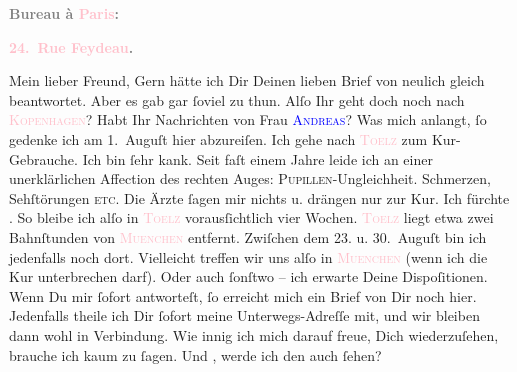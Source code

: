            \pstart
           \begin{otherlanguage}{french}\textcolor{gray}{\textbf{\textbf{Bureau à \textcolor{pink}{Paris}{}\ledrightnote{\textcolor{pink}{Paris}}:}}}\end{otherlanguage}\pend
           \pstart
           \begin{otherlanguage}{french}\textcolor{gray}{\textbf{\textbf{\textcolor{pink}{24. Rue Feydeau}{}\ledrightnote{\textcolor{pink}{rue Feydeau}}.}}}\end{otherlanguage}\pend
           \pstart\center{}Mein lieber Freund,\pend\pstart
           Gern hätte ich Dir Deinen lieben Brief von neulich gleich beantwortet. Aber es gab
               gar ſoviel zu thun.\pend
           \pstart
           Alſo Ihr geht doch noch nach \textsc{\textcolor{pink}{Kopenhagen}{}\ledrightnote{\textcolor{pink}{Kopenhagen}}}? Habt Ihr Nachrichten von Frau \textsc{\textcolor{blue}{Andreas}{}\ledrightnote{\textcolor{blue}{Lou Andreas-Salomé}}}?\pend
           \pstart
           Was mich anlangt, ſo gedenke ich am 1. Auguſt hier
               abzureiſen. Ich gehe nach \textsc{\textcolor{pink}{Toelz}{}\ledrightnote{\textcolor{pink}{Bad Tölz}}} zum Kur-Gebrauche. Ich bin ſehr kank. Seit faſt einem Jahre leide ich an einer
               unerklärlichen Affection des rechten Auges: \textsc{Pupillen}-Ungleichheit. Schmerzen, {\pb}Sehſtörungen \textsc{etc}. Die  Ärzte ſagen mir nichts u. drängen nur zur Kur.
               Ich fürchte \label{K_L02741-1v}\label{K_L02741-1h}.\pend
           \pstart
           So bleibe ich alſo in \textsc{\textcolor{pink}{Toelz}{}\ledrightnote{\textcolor{pink}{Bad Tölz}}} vorausſichtlich vier Wochen. \textsc{\textcolor{pink}{Toelz}{}\ledrightnote{\textcolor{pink}{Bad Tölz}}} liegt etwa zwei Bahnſtunden von \textsc{\textcolor{pink}{Muenchen}{}\ledrightnote{\textcolor{pink}{München}}} entfernt. Zwiſchen dem 23. u. 30. Auguſt bin ich jedenfalls noch dort. Vielleicht
               treffen wir uns alſo in \textsc{\textcolor{pink}{Muenchen}{}\ledrightnote{\textcolor{pink}{München}}} (wenn ich die Kur unterbrechen darf). Oder auch ſonſtwo – ich erwarte Deine
               Dispoſitionen. Wenn Du mir ſofort antworteſt, ſo erreicht mich ein Brief von Dir noch
               hier. Jedenfalls theile ich Dir {\pb}ſofort meine  Unterwegs-Adreſſe mit, und wir bleiben dann wohl in Verbindung. Wie innig ich
               mich darauf freue, Dich wiederzuſehen, brauche ich kaum zu ſagen. Und \label{K_L02741-255v}\label{K_L02741-255h}, werde ich den auch ſehen?\pend
